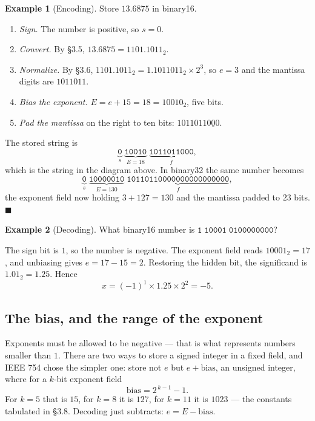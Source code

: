 \documentclass[11pt]{article}
\theoremstyle{plain}
\theoremstyle{definition}
\newtheorem{ex}{Example}[section]
\theoremstyle{remark}
\begin{document}
\begin{ex}[Encoding]
Store $13.6875$ in binary16.
\begin{enumerate}[label=\textbf{\arabic*.},leftmargin=2.4em,itemsep=3pt,topsep=4pt]
  \item \emph{Sign.} The number is positive, so $s=0$.
  \item \emph{Convert.} By \S3.5, $13.6875 = 1101.1011_{2}$.
  \item \emph{Normalize.} By \S3.6, $1101.1011_{2}=1.1011011_{2}\times2^{3}$, so
        $e=3$ and the mantissa digits are $1011011$.
  \item \emph{Bias the exponent.} $E = e+15 = 18 = 10010_{2}$, five bits.
  \item \emph{Pad the mantissa} on the right to ten bits:
        $1011011\underline{000}$.
\end{enumerate}
The stored string is
\[
  \underbrace{\texttt{0}}_{s}\;
  \underbrace{\texttt{10010}}_{E=18}\;
  \underbrace{\texttt{1011011000}}_{f},
\]
which is the string in the diagram above. In binary32 the same number becomes
\[
  \underbrace{\texttt{0}}_{s}\;
  \underbrace{\texttt{10000010}}_{E=130}\;
  \underbrace{\texttt{10110110000000000000000}}_{f},
\]
the exponent field now holding $3+127=130$ and the mantissa padded to
$23$ bits. \hfill$\blacksquare$
\end{ex}

\begin{ex}[Decoding]
What binary16 number is $\texttt{1}\;\texttt{10001}\;\texttt{0100000000}$?

The sign bit is $1$, so the number is negative. The exponent field reads
$10001_{2}=17$, and unbiasing gives $e=17-15=2$. Restoring the hidden bit, the
significand is $1.01_{2}=1.25$. Hence
\begin{equation*}
  x = (-1)^{1}\times 1.25\times 2^{2} = -5 .
  \tag*{$\blacksquare$}
\end{equation*}
\end{ex}

\subsection{The bias, and the range of the exponent}
Exponents must be allowed to be negative --- that is what represents numbers
smaller than $1$. There are two ways to store a signed integer in a fixed field,
and IEEE 754 chose the simpler one: store not $e$ but $e+\text{bias}$, an
unsigned integer, where for a $k$-bit exponent field
\[
  \text{bias} = 2^{\,k-1}-1 .
\]
For $k=5$ that is $15$, for $k=8$ it is $127$, for $k=11$ it is $1023$ --- the
constants tabulated in \S3.8. Decoding just subtracts: $e = E-\text{bias}$.
\end{document}
